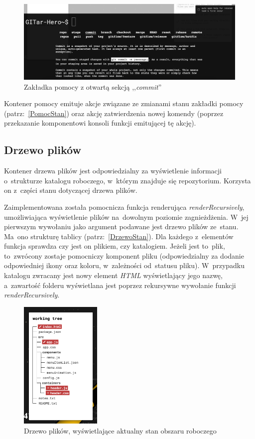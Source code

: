 \documentclass[12pt,a4paper,polish,thesis]{dcsbook}
\begin{document}
{	  \begin{figure}[h]
	  	\centering
	  	\includegraphics[width=15cm]{component-help-drawer}
	  	\caption{Zakładka pomocy z otwartą sekcją ,,\textit{commit}''}
	  	\label{fig:help-drawer}
	  \end{figure}

	  Kontener pomocy emituje akcje związane ze zmianami stanu zakładki pomocy (patrz:~\ref{PomocStan}) oraz akcję zatwierdzenia nowej komendy (poprzez przekazanie komponentowi konsoli funkcji emitującej tę akcję).

	\subsection{Drzewo plików}

	Kontener drzewa plików jest odpowiedzialny za wyświetlenie informacji o~strukturze katalogu roboczego, w~którym znajduje się repozytorium. Korzysta on z~części stanu dotyczącej drzewa plików.

	Zaimplementowana została pomocnicza funkcja renderująca \textit{renderRecursively}, umożliwiająca wyświetlenie plików na~dowolnym poziomie zagnieżdżenia. W~jej pierwszym wywołaniu jako argument podawane jest drzewo plików ze~stanu. Ma~ono strukturę tablicy (patrz:~\ref{DrzewoStan}). Dla każdego z~elementów funkcja sprawdza czy jest on plikiem, czy katalogiem. Jeżeli jest to~plik, to~zwrócony zostaje pomocniczy komponent pliku (odpowiedzialny za dodanie odpowiedniej ikony oraz koloru, w~zależności od~statusu pliku). W~przypadku katalogu zwracany jest nowy element \textit{HTML} wyświetlający jego nazwę, a~zawartość folderu wyświetlana jest poprzez rekursywne wywołanie funkcji \textit{renderRecursively}.

	\begin{figure}[h]
		\centering
		\includegraphics[height=6.2cm]{component-tree}
		\caption{Drzewo plików, wyświetlające aktualny stan obszaru roboczego}
		\label{fig:tree}
	\end{figure}

}
\end{document}
